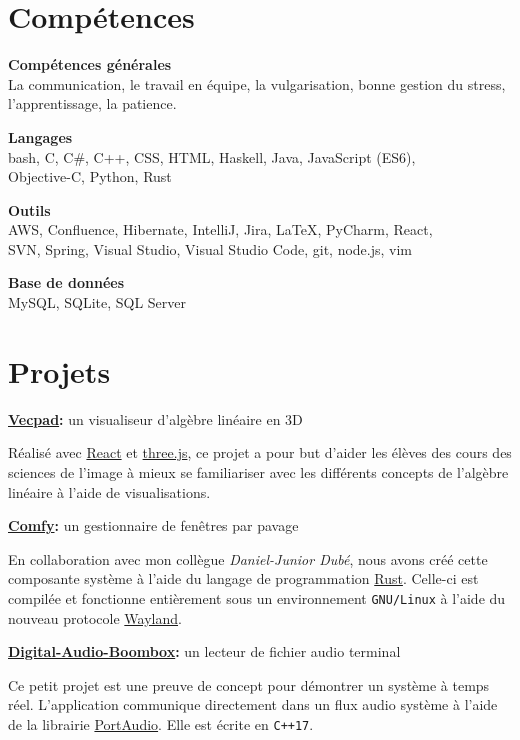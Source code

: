 \documentclass[french]{article}
\begin{document}
	\section{Compétences}

	\textbf{Compétences générales} \\
	La communication, le travail en équipe, la vulgarisation, bonne gestion du stress, l'apprentissage, la patience.

	\textbf{Langages} \\
	{\ttfamily bash, C, C\#, C++, CSS, HTML, Haskell, Java, JavaScript (ES6), \\ Objective-C, Python, Rust}

	\textbf{Outils} \\
	{\ttfamily AWS, Confluence, Hibernate, IntelliJ, Jira,} \LaTeX{\ttfamily , PyCharm, React, \\ SVN, Spring, Visual Studio, Visual Studio Code, git, node.js, vim}

	\textbf{Base de données} \\
	{\ttfamily MySQL, SQLite, SQL Server}

	\section{Projets}
	{\large \bfseries \href{https://vecpad.netlify.com/}{Vecpad}:}
	{\large un visualiseur d'algèbre linéaire en 3D}

	Réalisé avec \href{https://reactjs.org/}{React} et \href{https://threejs.org/}{three.js}, ce projet a pour but d'aider les élèves des cours des sciences de l'image à mieux se familiariser avec les différents concepts de l'algèbre linéaire à l'aide de visualisations.

	\bigskip
	{\large \bfseries \href{https://github.com/daniel-junior-dube/comfywm}{Comfy}:}
	{\large un gestionnaire de fenêtres par pavage}

	En collaboration avec mon collègue \textit{Daniel-Junior Dubé}, nous avons créé cette composante système à l'aide du langage de programmation \href{https://www.rust-lang.org/}{Rust}. Celle-ci est compilée et fonctionne entièrement sous un environnement \texttt{GNU/Linux} à l'aide du nouveau protocole \href{https://wayland.freedesktop.org/}{Wayland}.

	\bigskip
	{\large \bfseries \href{https://github.com/Chabam/digital-audio-boombox}{Digital-Audio-Boombox}:}
	{\large un lecteur de fichier audio terminal}

	Ce petit projet est une preuve de concept pour démontrer un système à temps réel. L'application communique directement dans un flux audio système à l'aide de la librairie \href{http://www.portaudio.com/}{PortAudio}. Elle est écrite en \texttt{C++17}.
\end{document}
